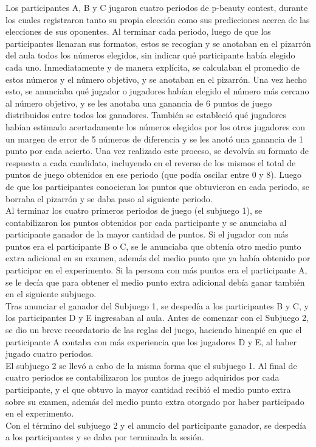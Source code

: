 Los participantes A, B y C jugaron cuatro periodos de p-beauty contest, durante los cuales registraron tanto su propia elección como sus predicciones acerca de las elecciones de sus oponentes. Al terminar cada periodo, luego de que los participantes llenaran sus formatos, estos se recogían y se anotaban en el pizarrón del aula todos los números elegidos, sin indicar qué participante había elegido cada uno. Inmediatamente y de manera explícita, se calculaban el promedio de estos números y el número objetivo, y se anotaban en el pizarrón. Una vez hecho esto, se anunciaba qué jugador o jugadores habían elegido el número más cercano al número objetivo, y se les anotaba una ganancia de 6 puntos de juego distribuidos entre todos los ganadores. También se estableció qué jugadores habían estimado acertadamente los números elegidos por los otros jugadores con un margen de error de 5 números de diferencia y se les anotó una ganancia de 1 punto por cada acierto. Una vez realizado este proceso, se devolvía su formato de respuesta a cada candidato, incluyendo en el reverso de los mismos el total de puntos de juego obtenidos en ese periodo (que podía oscilar entre 0 y 8). Luego de que los participantes conocieran los puntos que obtuvieron en cada periodo, se borraba el pizarrón y se daba paso al siguiente periodo.\\

Al terminar los cuatro primeros periodos de juego (el subjuego 1), se contabilizaron los puntos obtenidos por cada participante y se anunciaba al participante ganador de la mayor cantidad de puntos. Si el jugador con más puntos era el participante B o C, se le anunciaba que obtenía otro medio punto extra adicional en su examen, además del medio punto que ya había obtenido por participar en el experimento. Si la persona con más puntos era el participante A, se le decía que para obtener el medio punto extra adicional debía ganar también en el siguiente subjuego.\\

Tras anunciar el ganador del Subjuego 1, se despedía a los participantes B y C, y los participantes D y E ingresaban al aula. Antes de comenzar con el Subjuego 2, se dio un breve recordatorio de las reglas del juego, haciendo hincapié en que el participante A contaba con más experiencia que los jugadores D y E, al haber jugado cuatro periodos.\\

El subjuego 2 se llevó a cabo de la misma forma que el subjuego 1. Al final de cuatro periodos se contabilizaron los puntos de juego adquiridos por cada participante, y el que obtuvo la mayor cantidad recibió el medio punto extra sobre su examen, además del medio punto extra otorgado por haber participado en el experimento.\\

Con el término del subjuego 2 y el anuncio del participante ganador, se despedía a los participantes y se daba por terminada la sesión.\\

